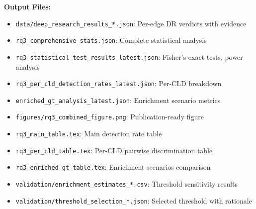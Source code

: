 \textbf{Output Files:}
\begin{itemize}[noitemsep]
    \item \texttt{data/deep\_research\_results\_*.json}: Per-edge DR verdicts with evidence
    \item \texttt{rq3\_comprehensive\_stats.json}: Complete statistical analysis
    \item \texttt{rq3\_statistical\_test\_results\_latest.json}: Fisher's exact tests, power analysis
    \item \texttt{rq3\_per\_cld\_detection\_rates\_latest.json}: Per-CLD breakdown
    \item \texttt{enriched\_gt\_analysis\_latest.json}: Enrichment scenario metrics
    \item \texttt{figures/rq3\_combined\_figure.png}: Publication-ready figure
    \item \texttt{rq3\_main\_table.tex}: Main detection rate table
    \item \texttt{rq3\_per\_cld\_table.tex}: Per-CLD pairwise discrimination table
    \item \texttt{rq3\_enriched\_gt\_table.tex}: Enrichment scenarios comparison
    \item \texttt{validation/enrichment\_estimates\_*.csv}: Threshold sensitivity results
    \item \texttt{validation/threshold\_selection\_*.json}: Selected threshold with rationale
\end{itemize}

